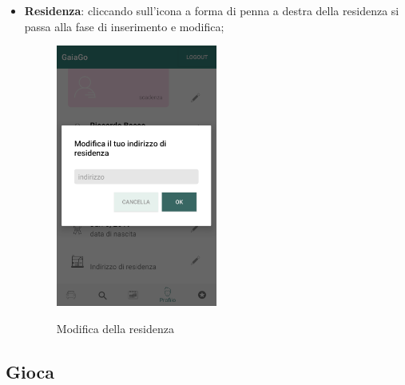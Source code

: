 \begin{itemize}
\item \textbf{Residenza}: cliccando sull'icona a forma di penna a destra della residenza si passa alla fase di inserimento e modifica;
\begin{figure}[H] 
	\centering 
	\includegraphics[width=0.5\textwidth]{res/images/modifica_residenza.png}\\
	\caption{Modifica della residenza}
	\label{modifiresidenza}
\end{figure}
\pagebreak
\end{itemize}

\subsection{Gioca}
